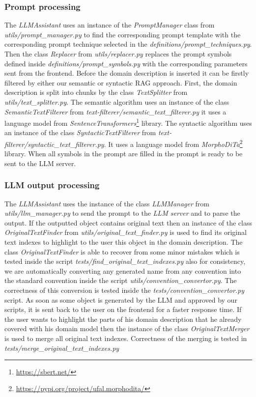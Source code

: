 \subsubsection{Prompt processing}

The \textit{LLMAssistant} uses an instance of the \textit{PromptManager} class from \textit{utils/prompt\_manager.py} to find the corresponding prompt template with the corresponding prompt technique selected in the \textit{definitions/prompt\_techniques.py}.
Then the class \textit{Replacer} from \textit{utils/replacer.py} replaces the prompt symbols defined inside \textit{definitions/prompt\_symbols.py} with the corresponding parameters sent from the frontend. Before the domain description is inserted it can be firstly filtered by either our semantic or syntactic RAG approach. First, the domain description is split into chunks by the class \textit{TextSplitter} from \textit{utils/text\_splitter.py}. The semantic algorithm uses an instance of the class \textit{SemanticTextFilterer} from \textit{text-filterer/semantic\_text\_filterer.py} it uses a language model from \textit{SentenceTransformers}\footnote{\url{https://sbert.net/}} library. The syntactic algorithm uses an instance of the class \textit{SyntacticTextFilterer} from \textit{text-filterer/syntactic\_text\_filterer.py}. It uses a language model from \textit{MorphoDiTa}\footnote{\url{https://pypi.org/project/ufal.morphodita/}} library. When all symbols in the prompt are filled in the prompt is ready to be sent to the LLM server.


\subsubsection{LLM output processing}

The \textit{LLMAssistant} uses the instance of the class \textit{LLMManager} from \textit{utils/llm\_manager.py} to send the prompt to the \emph{LLM server} and to parse the output. If the outputted object contains original text then an instance of the class \textit{OriginalTextFinder} from \textit{utils/original\_text\_finder.py} is used to find its original text indexes to highlight to the user this object in the domain description. The class \textit{OriginalTextFinder} is able to recover from some minor mistakes which is tested inside the script \textit{tests/find\_original\_text\_indexes.py}
also for consistency, we are automatically converting any generated name from any convention into the standard convention inside the script \textit{utils/convention\_convertor.py}. The correctness of this conversion is tested inside the \textit{tests/convention\_convertor.py} script. As soon as some object is generated by the LLM and approved by our scripts, it is sent back to the user on the frontend for a faster response time. If the user wants to highlight the parts of his domain description that he already covered with his domain model then the instance of the class \textit{OriginalTextMerger} is used to merge all original text indexes. Correctness of the merging is tested in \textit{tests/merge\_original\_text\_indexes.py}